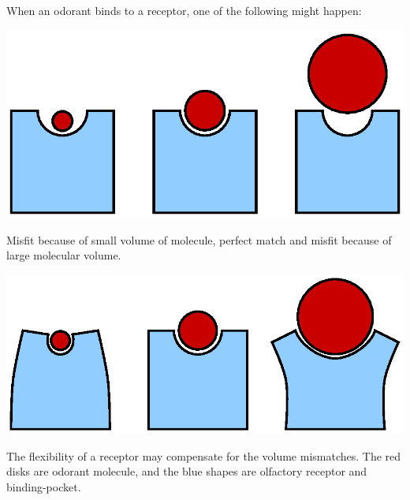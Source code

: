 \documentclass[a1paper,fontscale=0.5]{baposter} %
\begin{document}
\begin{poster}
{%
%
%

When an odorant binds to a receptor, one of the following might happen:
\begin{center}
\includegraphics[width=0.5 \textwidth]{fig/binding-pocket-size} \\
\end{center}
Misfit because of small volume of molecule, perfect match and misfit because of large molecular volume.
\begin{center}
\includegraphics[width=0.5 \textwidth]{fig/binding-pocket-flex}
\end{center}
The flexibility of a receptor may compensate for the volume mismatches. 
The red disks are odorant molecule, 
and the blue shapes are olfactory receptor and binding-pocket.

}
\end{poster}
\end{document}
